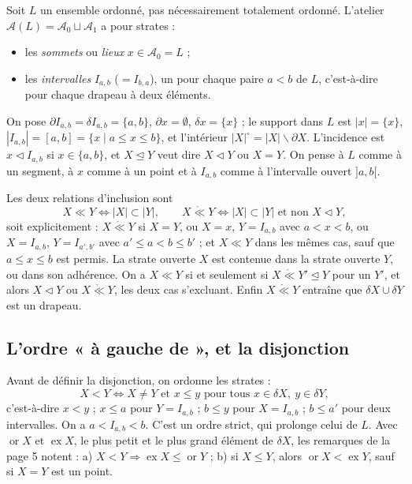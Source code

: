 \documentclass[11pt,a4paper]{article}
\begin{document}
Soit $L$ un ensemble ordonné, pas nécessairement totalement ordonné. L'atelier
$\mathcal{A}(L) = \mathcal{A}_{0} \sqcup \mathcal{A}_{1}$ a pour strates :
\begin{itemize}
\item les \emph{sommets} ou \emph{lieux} $x \in \mathcal{A}_{0} = L$ ;
\item les \emph{intervalles} $I_{a,b}$ ($= I_{b,a}$), un pour chaque paire $a <
b$ de $L$, c'est-à-dire pour chaque drapeau à deux éléments.
\end{itemize}
On pose $\partial I_{a,b} = \delta I_{a,b} = \{a,b\}$, $\partial x = \emptyset$,
$\delta x = \{x\}$ ; le support dans $L$ est $|x| = \{x\}$, $|I_{a,b}| = [a,b]
= \{x \mid a \leq x \leq b\}$, et l'intérieur $|X|^{\circ} = |X|
\smallsetminus \partial X$. L'incidence est $x \lhd I_{a,b}$ si $x \in \{a,
b\}$, et $X \trianglelefteq Y$ veut dire $X \lhd Y$ ou $X = Y$. On pense à $L$
comme à un segment, à $x$ comme à un point et à $I_{a,b}$ comme à l'intervalle
ouvert $]a,b[$.

Les deux relations d'inclusion sont
\[
X \ll Y \iff |X| \subset |Y|, \qquad X \mathrel{\mathring{\ll}} Y \iff |X|
\subset |Y| \text{ et non } X \lhd Y,
\]
soit explicitement : $X \mathrel{\mathring{\ll}} Y$ si $X = Y$, ou $X = x$, $Y =
I_{a,b}$ avec $a < x < b$, ou $X = I_{a,b}$, $Y = I_{a',b'}$ avec $a' \leq a < b
\leq b'$ ; et $X \ll Y$ dans les mêmes cas, sauf que $a \leq x \leq b$ est
permis. La strate ouverte $X$ est contenue dans la strate ouverte $Y$, ou dans
son adhérence. On a $X \ll Y$ si et seulement si $X \mathrel{\mathring{\ll}} Y'
\trianglelefteq Y$ pour un $Y'$, et alors $X \lhd Y$ ou $X
\mathrel{\mathring{\ll}} Y$, les deux cas s'excluant. Enfin $X
\mathrel{\mathring{\ll}} Y$ entraîne que $\delta X \cup \delta Y$ est un drapeau.

\subsection*{L'ordre « à gauche de », et la disjonction}

Avant de définir la disjonction, on ordonne les strates :
\[
X < Y \iff X \neq Y \text{ et } x \leq y \text{ pour tous } x \in \delta X,\ y
\in \delta Y ,
\]
c'est-à-dire $x < y$ ; $x \leq a$ pour $Y = I_{a,b}$ ; $b \leq y$ pour $X =
I_{a,b}$ ; $b \leq a'$ pour deux intervalles. On a $a < I_{a,b} < b$. C'est un
ordre strict, qui prolonge celui de $L$. Avec $\operatorname{or} X$ et
$\operatorname{ex} X$, le plus petit et le plus grand élément de $\delta X$, les
remarques de la page 5 notent : a) $X < Y \Rightarrow \operatorname{ex} X \leq
\operatorname{or} Y$ ; b) si $X \leq Y$, alors $\operatorname{or} X <
\operatorname{ex} Y$, sauf si $X = Y$ est un point.
\end{document}
